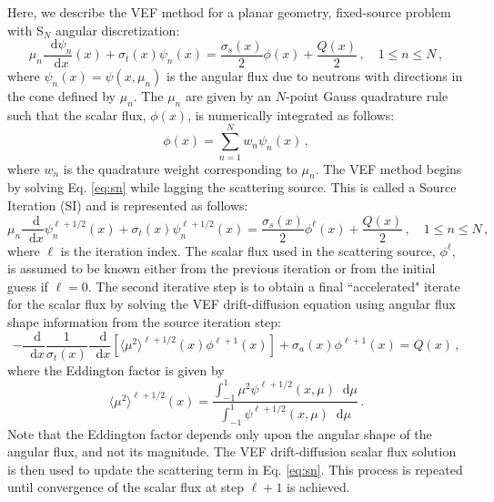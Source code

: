 \documentclass{ictt25}
\newcommand{\SN}{S$_N$\xspace}
\newcommand{\ud}{\mathop{}\!\mathrm{d}} %
\newcommand{\dderiv}[2]{\frac{\ud #1}{\ud #2}}
\newcommand{\edd}{\langle \mu^2 \rangle}
\newcommand{\rell}{^\ell} %
\newcommand{\relll}{^{\ell+1}} %
\newcommand{\rellh}{^{\ell+1/2}} %
\newcommand{\bracket}[1]{\left[ #1 \right]}
\begin{document}
Here, we describe the VEF method for a planar geometry, fixed-source problem with \SN angular discretization:
	\begin{equation} \label{eq:sn}
		\mu_n \dderiv{\psi_n}{x}(x) + \sigma_t(x) \psi_n(x) = 
		\frac{\sigma_s(x)}{2} \phi(x) + \frac{Q(x)}{2} \,, \quad 1 \leq n \leq N \,,
	\end{equation}
where $\psi_n(x) = \psi(x, \mu_n)$ is the angular flux due to neutrons with directions in the cone defined by $\mu_n$.  The $\mu_n$ are given by an $N$-point Gauss quadrature rule such that the scalar flux, $\phi(x)$, is numerically integrated as follows: 
	\begin{equation} \label{eq:phiquad}
		\phi(x) = \sum_{n=1}^N w_n \psi_n(x) \,,
	\end{equation}
where $w_n$ is the quadrature weight corresponding to $\mu_n$. The VEF method begins by solving Eq. \ref{eq:sn} while lagging the scattering source. This is called a Source Iteration (SI) and is represented as follows:
	\begin{equation} \label{eq:si}
		\mu_n \dderiv{}{x}\psi_n\rellh(x) + \sigma_t(x) \psi_n\rellh(x) = 
		\frac{\sigma_s(x)}{2} \phi^\ell(x) + \frac{Q(x)}{2} \,, \quad 1 \leq n \leq N \,,
	\end{equation}
where $\ell$ is the iteration index. The scalar flux used in the scattering source, $\phi\rell$, is assumed to be known either from the previous iteration or from the initial guess if $\ell=0$. The second iterative step is to obtain a final ``accelerated" iterate for the scalar flux by solving the VEF drift-diffusion equation using angular flux shape information from the source iteration step:
	\begin{equation} \label{eq:drift}
	-\dderiv{}{x} \frac{1}{\sigma_t(x)} \dderiv{}{x} \bracket{\edd\rellh(x)\phi\relll(x)} + \sigma_a(x) \phi\relll(x) = Q(x) \,,
	\end{equation}
	where the Eddington factor is given by
	\begin{equation} \label{eq:eddington} 
			\edd\rellh(x) = \frac{\int_{-1}^1 \mu^2 \psi\rellh(x, \mu) \ud \mu}{\int_{-1}^1 \psi\rellh(x, \mu) \ud \mu} \, .
		\end{equation}
Note that the Eddington factor depends only upon the angular shape of the angular flux, and not its magnitude. The VEF drift-diffusion scalar flux solution is then used to update the scattering term in Eq. \ref{eq:sn}. This process is repeated until convergence of the scalar flux at step $\ell+1$ is achieved. 
\end{document}
